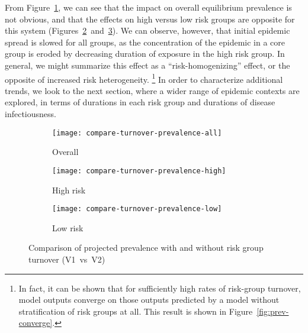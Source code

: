 From Figure~\ref{fig:compare-turnover-prevalence-all},
we can see that the impact on overall equilibrium prevalence is not obvious,
and that the effects on high versus low risk groups are opposite for this system
(Figures~\ref{fig:compare-turnover-prevalence-high}~and~\ref{fig:compare-turnover-prevalence-low}).
We can observe, however, that initial epidemic spread is slowed for all groups,
as the concentration of the epidemic in a core group is eroded by 
decreasing duration of exposure in the high risk group.
In general, we might summarize this effect as a ``risk-homogenizing'' effect,
or the opposite of increased risk heterogeneity.%
\footnote{In fact, it can be shown that for sufficiently high rates of risk-group turnover,
  model outputs converge on those outputs predicted by
  a model without stratification of risk groups at all.
  This result is shown in Figure~\ref{fig:prev-converge}.}
In order to characterize additional trends, we look to the next section,
where a wider range of epidemic contexts are explored,
in terms of durations in each risk group and durations of disease infectiousness.
\par
\begin{figure}
  \centering
  \begin{subfigure}{0.31\linewidth}
    \centering
    \texttt{[image: compare-turnover-prevalence-all]}
    \caption{Overall}
    \label{fig:compare-turnover-prevalence-all}
  \end{subfigure}
  \begin{subfigure}{0.31\linewidth}
    \centering
    \texttt{[image: compare-turnover-prevalence-high]}
    \caption{High risk}
    \label{fig:compare-turnover-prevalence-high}
  \end{subfigure}
  \begin{subfigure}{0.31\linewidth}
    \centering
    \texttt{[image: compare-turnover-prevalence-low]}
    \caption{Low risk}
    \label{fig:compare-turnover-prevalence-low}
  \end{subfigure}
  \caption{Comparison of projected prevalence with and without risk group turnover (V1~vs~V2)}
  \label{fig:compare-turnover-prevalence}
\end{figure}
